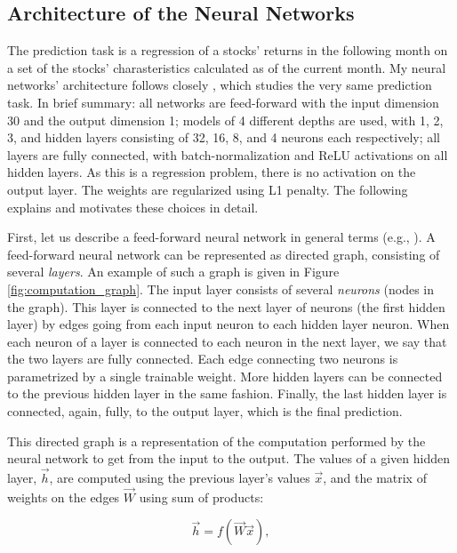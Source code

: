 	\subsection{Architecture of the Neural Networks}
		\label{chap:architecture}
	
		The prediction task is a regression of a stocks' returns in the following month on a set of the stocks' charasteristics calculated as of the current month. My neural networks' architecture follows closely \cite{gu2020empirical}, which studies the very same prediction task. In brief summary: all networks are feed-forward with the input dimension 30 and the output dimension 1; models of 4 different depths are used, with 1, 2, 3, and hidden layers consisting of 32, 16, 8, and 4 neurons each respectively; all layers are fully connected, with batch-normalization \citep{ioffe2015batch} and ReLU activations on all hidden layers. As this is a regression problem, there is no activation on the output layer. The weights are regularized using L1 penalty. The following explains and motivates these choices in detail.
		
		First, let us describe a feed-forward neural network in general terms (e.g., \cite{goodfellow2016deep}). A feed-forward neural network can be represented as directed graph, consisting of several \textit{layers}. An example of such a graph is given in Figure \ref{fig:computation_graph}. The input layer consists of several \textit{neurons} (nodes in the graph). This layer is connected to the next layer of neurons (the first hidden layer) by edges going from each input neuron to each hidden layer neuron. When each neuron of a layer is connected to each neuron in the next layer, we say that the two layers are fully connected. Each edge connecting two neurons is parametrized by a single trainable weight. More hidden layers can be connected to the previous hidden layer in the same fashion. Finally, the last hidden layer is connected, again, fully, to the output layer, which is the final prediction.
		
		This directed graph is a representation of the computation performed by the neural network to get from the input to the output. The values of a given hidden layer, $\vec{h}$, are computed using the previous layer's values $\vec{x}$, and the matrix of weights on the edges $\vec{W}$ using sum of products: 
		
		\begin{equation}
			\label{eqn:hidden_layer}
			\vec{h} = f(\vec{W}\vec{x}),
		\end{equation}
		
